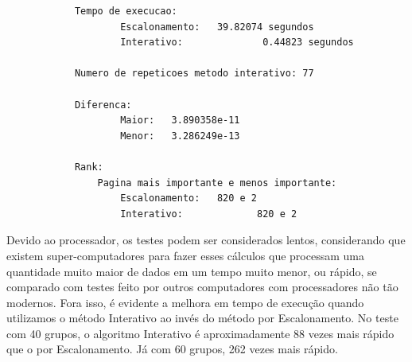 \documentclass[12pt]{article}
\begin{document}
		\begin{lstlisting}
			Tempo de execucao:
		 			Escalonamento: 	 39.82074 segundos
		 			Interativo: 	 	 	 0.44823 segundos

			Numero de repeticoes metodo interativo: 77 

			Diferenca: 
		 			Maior: 	 3.890358e-11
		 			Menor: 	 3.286249e-13

			Rank: 
		 		Pagina mais importante e menos importante:
		 	 		Escalonamento: 	 820 e 2
		 	 		Interativo: 	 	 	820 e 2
		\end{lstlisting}
		
		Devido ao processador, os testes podem ser considerados lentos, considerando que existem super-computadores para fazer esses cálculos que processam uma quantidade muito maior de dados em um tempo muito menor, ou rápido, se comparado com testes feito por outros computadores com processadores não tão modernos. Fora isso, é evidente a melhora em tempo de execução quando utilizamos o método Interativo ao invés do método por Escalonamento. No teste com 40 grupos, o algoritmo Interativo é aproximadamente 88 vezes mais rápido que o por Escalonamento. Já com 60 grupos, 262 vezes mais rápido.
\end{document}
